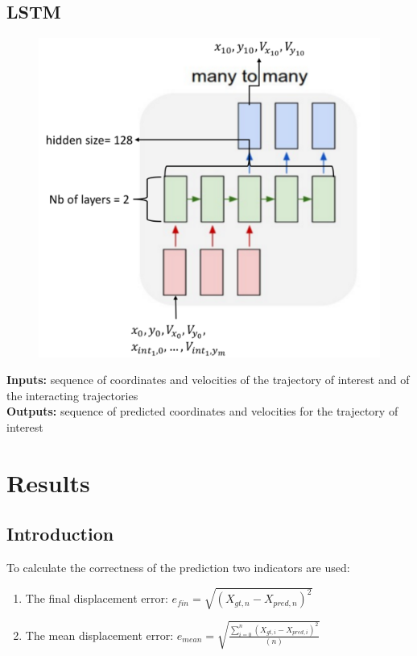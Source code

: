 \documentclass[a0,portrait]{a0poster}
\begin{document}
\begin{multicols}{2}
\subsection{LSTM}

\begin{figure}
\includegraphics[scale = 0.23]{figure/manytomany}
\end{figure}
\textbf{Inputs:} sequence of coordinates and velocities of the trajectory of interest and of the interacting trajectories\\
\textbf{Outputs:} sequence of predicted coordinates and velocities for the trajectory of interest 




\section{Results}
\subsection{Introduction}
To calculate the correctness of the prediction two indicators are used:
\begin{enumerate}
\justifying
\item The final displacement error: $e_{fin} = \sqrt{(X_{gt,n}-X_{pred,n})^2}$
\item The mean displacement error: $e_{mean} = \sqrt{\frac{\sum_{i=0}^n(X_{gt,i}-X_{pred,i})^2}{(n)}}$
\end{enumerate}
\vspace{0.5cm}


\end{multicols}
\end{document}
